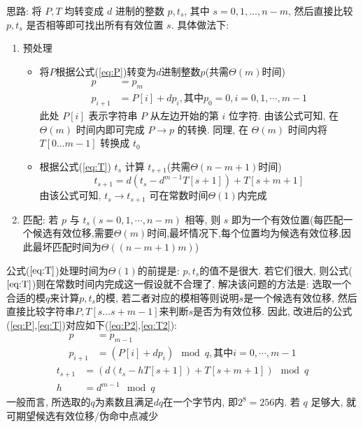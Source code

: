 思路: 将 $P,T$ 均转变成 $d$ 进制的整数 $p,t_s$, 其中 $s=0,1,\dots,n-m$, 然后直接比较 $p,t_s$ 是否相等即可找出所有有效位置 $s$. 具体做法下:
\begin{enumerate}
\item 预处理\
    \begin{itemize}
        \item 将$P$根据公式(\ref{eq:P})转变为$d$进制整数$p$(共需$\Theta(m)$时间) \
            \begin{equation}
                \begin{split}
                    p &= p_m \\
                    p_{i+1} &= P[i] + dp_i, \text{其中}p_0=0,i=0,1,\cdots,m-1 \label{eq:P}
                \end{split}
            \end{equation}
            此处 $P[i]$ 表示字符串 $P$ 从左边开始的第 $i$ 位字符. 由该公式可知, 在 $\Theta(m)$ 时间内即可完成 $P \to p$ 的转换. 同理, 在 $\Theta(m)$ 时间内将 $T[0 \dots m-1]$ 转换成 $t_0$
        \item 根据公式(\ref{eq:T}) $t_s$ 计算 $t_{s+1}$(共需$\Theta(n-m+1)$时间) \
            \begin{equation}
                t_{s+1} = d (t_s - d^{m-1} T[s+1]) + T[s+m+1] \label{eq:T}
            \end{equation}
            由该公式可知, $t_s \to t_{s+1}$ 可在常数时间$\Theta(1)$内完成
    \end{itemize}
\item 匹配: 若 $p$ 与 $t_s(s=0,1,\cdots,n-m)$ 相等, 则 $s$ 即为一个有效位置(每匹配一个候选有效位移,需要$\Theta(m)$时间,最坏情况下,每个位置均为候选有效位移,因此最坏匹配时间为$\Theta((n-m+1)m)$)
\end{enumerate}

公式($\ref{eq:T}$)处理时间为$\Theta(1)$的前提是: $p,t_s$的值不是很大. 若它们很大, 则公式($\ref{eq:T}$)则在常数时间内完成这一假设就不合理了. 解决该问题的方法是: 选取一个合适的模$q$来计算$p,t_s$的模, 若二者对应的模相等则说明$s$是一个候选有效位移, 然后直接比较字符串$P,T[s \dots s+m-1]$来判断$s$是否为有效位移. 因此, 改进后的公式(\ref{eq:P},\ref{eq:T})对应如下(\ref{eq:P2},\ref{eq:T2}):
\begin{equation}
    \begin{split}
        p &= p_{m-1} \\
        p_{i+1}  &= (P[i] + dp_i) \mod q, \text{其中}i=0,\cdots,m-1 \label{eq:P2}
    \end{split}
\end{equation}
\begin{equation}
    \begin{split}
        t_{s+1} &= \left(d(t_s - h T[s+1]) + T[s+m+1]\right) \mod q \\
        h &= d^{m-1} \mod q\label{eq:T2}
    \end{split}
\end{equation}
一般而言, 所选取的$q$为素数且满足$dq$在一个字节内, 即$2^8=256$内. 若 $q$ 足够大, 就可期望候选有效位移/伪命中点减少

